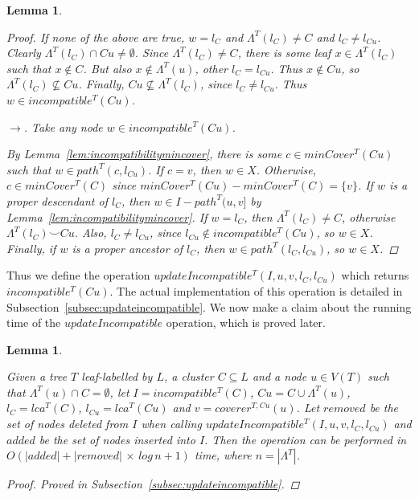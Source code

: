 \documentclass{article}
\newcommand{\compatible}{\smile}
\newcommand{\leafset}{\Lambda}
\newtheorem{updateincompatibleruntime}[incompatibility]{Lemma}
\newtheorem{incompatibilityrecursive}[incompatibility]{Lemma}
\begin{document}
\begin{incompatibilityrecursive}
\begin{proof}
            If none of the above are true, $w = l_C$ and $\leafset^{T}(l_C) \neq C$ and $l_C \neq l_{Cu}$. Clearly $\leafset^{T}(l_C) \cap Cu \neq \emptyset$. Since $\leafset^{T}(l_C) \neq C$, there is some leaf $x \in \leafset^{T}(l_C)$ such that $x \not\in C$. But also $x \not\in \leafset^{T}(u)$, other $l_C = l_{Cu}$. Thus $x \not\in Cu$, so $\leafset^{T}(l_C) \not\subseteq Cu$. Finally, $Cu \not\subseteq \leafset^{T}(l_C)$, since $l_C \neq l_{Cu}$. Thus $w \in incompatible^{T}(Cu)$.

            $\longrightarrow$. Take any node $w \in incompatible^{T}(Cu)$.

            By Lemma~\ref{lem:incompatibilitymincover}, there is some $c \in minCover^{T}(Cu)$ such that $w \in path^{T}(c, l_{Cu})$. If $c = v$, then $w \in X$. Otherwise, $c \in minCover^{T}(C)$ since $minCover^{T}(Cu) - minCover^{T}(C) = \{v\}$. If $w$ is a proper descendant of $l_C$, then $w \in I - path^{T}(u, v]$ by Lemma~\ref{lem:incompatibilitymincover}. If $w = l_C$, then $\leafset^{T}(l_C) \neq C$, otherwise $\leafset^{T}(l_C) \compatible Cu$. Also, $l_C \neq l_{Cu}$, since $l_{Cu} \not\in incompatible^{T}(Cu)$, so $w \in X$. Finally, if $w$ is a proper ancestor of $l_C$, then $w \in path^{T}(l_C, l_{Cu})$, so $w \in X$.
        \end{proof}
    \end{incompatibilityrecursive}

    Thus we define the operation $updateIncompatible^{T}(I, u, v, l_C, l_{Cu})$ which returns $incompatible^{T}(Cu)$. The actual implementation of this operation is detailed in Subsection~\ref{subsec:updateincompatible}. We now make a claim about the running time of the $updateIncompatible$ operation, which is proved later.
    \newline

    \begin{updateincompatibleruntime}
        \label{lem:updateincompatibleruntime}

        Given a tree $T$ leaf-labelled by $L$, a cluster $C \subseteq L$ and a node $u \in V(T)$ such that $\leafset^{T}(u) \cap C = \emptyset$, let $I = incompatible^{T}(C)$, $Cu = C \cup \leafset^{T}(u)$, $l_C = lca^{T}(C)$, $l_{Cu} = lca^{T}(Cu)$ and $v = coverer^{T, Cu}(u)$. Let $removed$ be the set of nodes deleted from $I$ when calling $updateIncompatible^{T}(I, u, v, l_C, l_{Cu})$ and $added$ be the set of nodes inserted into $I$. Then the operation can be performed in $O(|added| + |removed|\,\times\,log\,n + 1)$ time, where $n = |\leafset^{T}|$.

        \begin{proof}
            Proved in Subsection~\ref{subsec:updateincompatible}.
        \end{proof}
    \end{updateincompatibleruntime}
\end{document}
